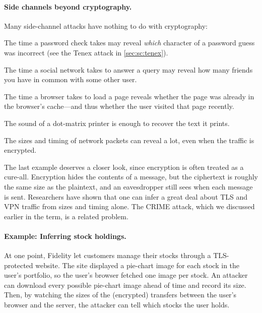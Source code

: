 \paragraph{Side channels beyond cryptography.}
Many side-channel attacks have nothing to do with cryptography:
\begin{compactitem}
  \item The time a password check takes may reveal \emph{which}
        character of a password guess was incorrect
        (see the Tenex attack in \cref{sec:sc:tenex}).
  \item The time a social network takes to answer a query may reveal
        how many friends you have in common with some other user.
  \item The time a browser takes to load a page reveals whether the
        page was already in the browser's cache---and thus whether the
        user visited that page recently.
  \item The sound of a dot-matrix printer is enough to recover the text
        it prints.\autocite{backes:printers}
  \item The sizes and timing of network packets can reveal a lot, even
        when the traffic is encrypted.
\end{compactitem}

The last example deserves a closer look, since encryption is often
treated as a cure-all.
Encryption hides the contents of a message, but the ciphertext is
roughly the same size as the plaintext, and an eavesdropper still sees
when each message is sent.
Researchers have shown that one can infer a great deal about TLS and
VPN traffic from sizes and timing alone.
The CRIME attack,\autocite{crime} which we discussed earlier in the term,
is a related problem.

\paragraph{Example: Inferring stock holdings.}
At one point, Fidelity let customers manage their stocks through a
TLS-protected website.
The site displayed a pie-chart image for each stock in the user's
portfolio, so the user's browser fetched one image per stock.
An attacker can download every possible pie-chart image ahead of time
and record its size.
Then, by watching the sizes of the (encrypted) transfers between the
user's browser and the server, the attacker can tell which stocks
the user holds.

